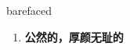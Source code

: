 
\begin{frame}
{\huge barefaced}
\begin{center}
\begin{enumerate}\Large
  \item \textbf{公然的，厚颜无耻的}
\end{enumerate}
\end{center}
\end{frame}
